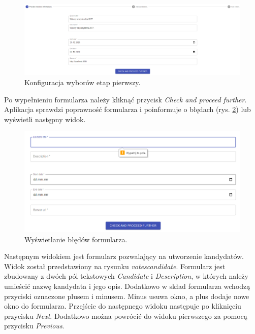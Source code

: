 \documentclass[a4paper,12pt]{book}
\begin{document}
\begin{figure}[h]
	\centering
	\includegraphics[width=\textwidth]{images/votesconfig1.png}
	\caption{Konfiguracja wyborów etap pierwszy.}\label{votesconfig1}
\end {figure}

Po wypełnieniu formularza należy kliknąć przycisk \textit{Check and proceed further}. Aplikacja sprawdzi poprawność formularza i poinformuje o błędach (rys. \ref{votesconfigerror}) lub wyświetli następny widok.

\begin{figure}[h]
	\centering
	\includegraphics[width=\textwidth]{images/votesconfigerror.png}
	\caption{Wyświetlanie błędów formularza.}\label{votesconfigerror}
\end {figure}

Następnym widokiem jest formularz pozwalający na utworzenie kandydatów. Widok został przedstawiony na rysunku \textit{votescandidate}. Formularz jest zbudowany z dwóch pól tekstowych \textit{Candidate} i \textit{Description}, w których należy umieścić nazwę kandydata i jego opis. Dodatkowo w skład formularza wchodzą przyciski oznaczone plusem i minusem. Minus usuwa okno, a plus dodaje nowe okno do formularza. Przejście do następnego widoku następuje po kliknięciu przycisku \textit{Next}. Dodatkowo można powrócić do widoku pierwszego za pomocą przycisku \textit{Previous}.
\newpage
\end{document}
